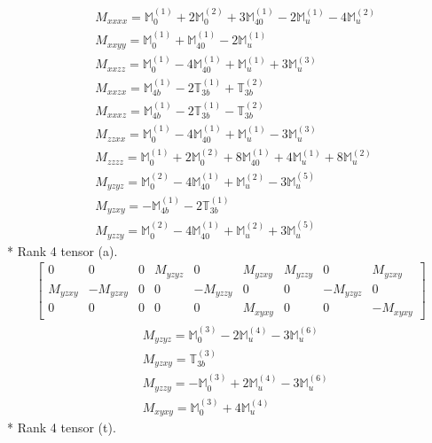 \documentclass[fleqn,8pt,landscape]{jsarticle}
\begin{document}
\begin{align*}
& M_{xxxx} = \mathbb{M}_{0}^{(1)} + 2 \mathbb{M}_{0}^{(2)} + 3 \mathbb{M}_{40}^{(1)} - 2 \mathbb{M}_{u}^{(1)} - 4 \mathbb{M}_{u}^{(2)} \\
& M_{xxyy} = \mathbb{M}_{0}^{(1)} + \mathbb{M}_{40}^{(1)} - 2 \mathbb{M}_{u}^{(1)} \\
& M_{xxzz} = \mathbb{M}_{0}^{(1)} - 4 \mathbb{M}_{40}^{(1)} + \mathbb{M}_{u}^{(1)} + 3 \mathbb{M}_{u}^{(3)} \\
& M_{xxzx} = \mathbb{M}_{4b}^{(1)} - 2 \mathbb{T}_{3b}^{(1)} + \mathbb{T}_{3b}^{(2)} \\
& M_{xxxz} = \mathbb{M}_{4b}^{(1)} - 2 \mathbb{T}_{3b}^{(1)} - \mathbb{T}_{3b}^{(2)} \\
& M_{zzxx} = \mathbb{M}_{0}^{(1)} - 4 \mathbb{M}_{40}^{(1)} + \mathbb{M}_{u}^{(1)} - 3 \mathbb{M}_{u}^{(3)} \\
& M_{zzzz} = \mathbb{M}_{0}^{(1)} + 2 \mathbb{M}_{0}^{(2)} + 8 \mathbb{M}_{40}^{(1)} + 4 \mathbb{M}_{u}^{(1)} + 8 \mathbb{M}_{u}^{(2)} \\
& M_{yzyz} = \mathbb{M}_{0}^{(2)} - 4 \mathbb{M}_{40}^{(1)} + \mathbb{M}_{u}^{(2)} - 3 \mathbb{M}_{u}^{(5)} \\
& M_{yzxy} = - \mathbb{M}_{4b}^{(1)} - 2 \mathbb{T}_{3b}^{(1)} \\
& M_{yzzy} = \mathbb{M}_{0}^{(2)} - 4 \mathbb{M}_{40}^{(1)} + \mathbb{M}_{u}^{(2)} + 3 \mathbb{M}_{u}^{(5)}
\end{align*}
* Rank 4 tensor (a).
\begin{align*}
\begin{bmatrix} 0 & 0 & 0 & M_{yzyz} & 0 & M_{yzxy} & M_{yzzy} & 0 & M_{yzxy} \\ M_{yzxy} & - M_{yzxy} & 0 & 0 & - M_{yzzy} & 0 & 0 & - M_{yzyz} & 0 \\ 0 & 0 & 0 & 0 & 0 & M_{xyxy} & 0 & 0 & - M_{xyxy} \end{bmatrix}
\end{align*}
\begin{align*}
& M_{yzyz} = \mathbb{M}_{0}^{(3)} - 2 \mathbb{M}_{u}^{(4)} - 3 \mathbb{M}_{u}^{(6)} \\
& M_{yzxy} = \mathbb{T}_{3b}^{(3)} \\
& M_{yzzy} = - \mathbb{M}_{0}^{(3)} + 2 \mathbb{M}_{u}^{(4)} - 3 \mathbb{M}_{u}^{(6)} \\
& M_{xyxy} = \mathbb{M}_{0}^{(3)} + 4 \mathbb{M}_{u}^{(4)}
\end{align*}
* Rank 4 tensor (t).
\end{document}
